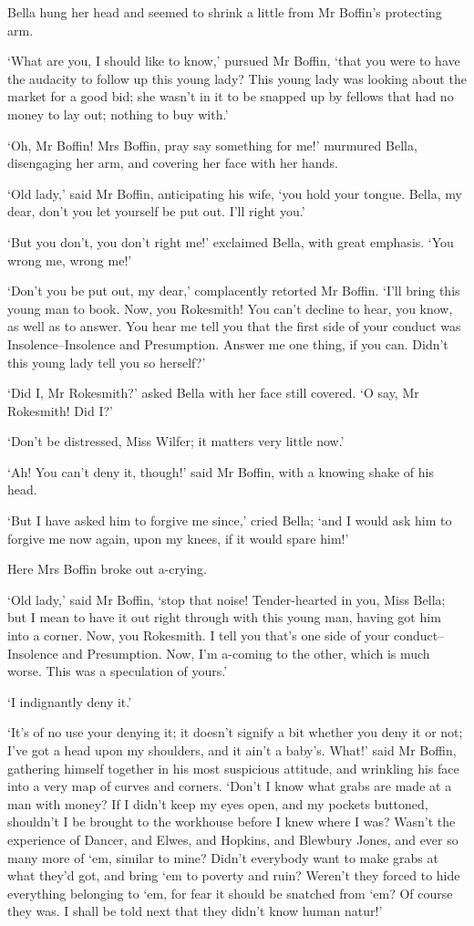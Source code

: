 Bella hung her head and seemed to shrink a little from Mr Boffin’s
protecting arm.

‘What are you, I should like to know,’ pursued Mr Boffin, ‘that you were
to have the audacity to follow up this young lady? This young lady was
looking about the market for a good bid; she wasn’t in it to be snapped
up by fellows that had no money to lay out; nothing to buy with.’

‘Oh, Mr Boffin! Mrs Boffin, pray say something for me!’ murmured Bella,
disengaging her arm, and covering her face with her hands.

‘Old lady,’ said Mr Boffin, anticipating his wife, ‘you hold your
tongue. Bella, my dear, don’t you let yourself be put out. I’ll right
you.’

‘But you don’t, you don’t right me!’ exclaimed Bella, with great
emphasis. ‘You wrong me, wrong me!’

‘Don’t you be put out, my dear,’ complacently retorted Mr Boffin. ‘I’ll
bring this young man to book. Now, you Rokesmith! You can’t decline
to hear, you know, as well as to answer. You hear me tell you that the
first side of your conduct was Insolence--Insolence and Presumption.
Answer me one thing, if you can. Didn’t this young lady tell you so
herself?’

‘Did I, Mr Rokesmith?’ asked Bella with her face still covered. ‘O say,
Mr Rokesmith! Did I?’

‘Don’t be distressed, Miss Wilfer; it matters very little now.’

‘Ah! You can’t deny it, though!’ said Mr Boffin, with a knowing shake of
his head.

‘But I have asked him to forgive me since,’ cried Bella; ‘and I would
ask him to forgive me now again, upon my knees, if it would spare him!’

Here Mrs Boffin broke out a-crying.

‘Old lady,’ said Mr Boffin, ‘stop that noise! Tender-hearted in you,
Miss Bella; but I mean to have it out right through with this young man,
having got him into a corner. Now, you Rokesmith. I tell you that’s one
side of your conduct--Insolence and Presumption. Now, I’m a-coming to
the other, which is much worse. This was a speculation of yours.’

‘I indignantly deny it.’

‘It’s of no use your denying it; it doesn’t signify a bit whether
you deny it or not; I’ve got a head upon my shoulders, and it ain’t a
baby’s. What!’ said Mr Boffin, gathering himself together in his most
suspicious attitude, and wrinkling his face into a very map of curves
and corners. ‘Don’t I know what grabs are made at a man with money? If
I didn’t keep my eyes open, and my pockets buttoned, shouldn’t I
be brought to the workhouse before I knew where I was? Wasn’t the
experience of Dancer, and Elwes, and Hopkins, and Blewbury Jones, and
ever so many more of ‘em, similar to mine? Didn’t everybody want to make
grabs at what they’d got, and bring ‘em to poverty and ruin? Weren’t
they forced to hide everything belonging to ‘em, for fear it should be
snatched from ‘em? Of course they was. I shall be told next that they
didn’t know human natur!’

